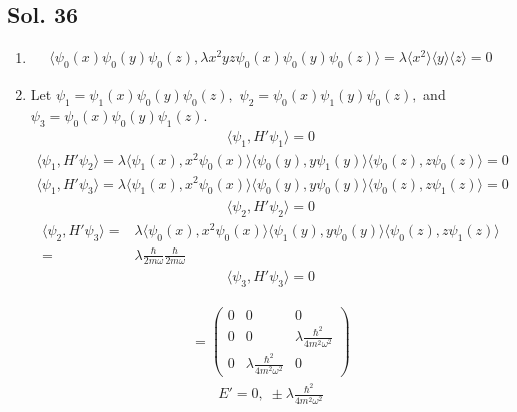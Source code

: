 \subsection*{Sol. 36}
\begin{enumerate}
    \item \begin{align*}
    \langle\psi_0(x)\psi_0(y)\psi_0(z), \lambda x^2yz\psi_0(x)\psi_0(y)\psi_0(z)\rangle=
    \lambda\langle x^2\rangle\langle y\rangle\langle z\rangle
    =0
\end{align*}
\item 
Let $\psi_1 = \psi_1(x)\psi_0(y)\psi_0(z),$ 
$\psi_2 = \psi_0(x)\psi_1(y)\psi_0(z),$ and 
$\psi_3 = \psi_0(x)\psi_0(y)\psi_1(z).$
\begin{align*}
    \langle \psi_1, H'\psi_1\rangle
    =0
\end{align*}
\begin{align*}
    \langle \psi_1, H'\psi_2\rangle
    =\lambda\langle\psi_1(x),x^2\psi_0(x)\rangle
    \langle\psi_0(y),y\psi_1(y)\rangle
    \langle\psi_0(z),z\psi_0(z)\rangle=0
\end{align*}
\begin{align*}
    \langle \psi_1, H'\psi_3\rangle
    =\lambda\langle\psi_1(x),x^2\psi_0(x)\rangle
    \langle\psi_0(y),y\psi_0(y)\rangle
    \langle\psi_0(z),z\psi_1(z)\rangle=0
\end{align*}
\begin{align*}
    \langle \psi_2, H'\psi_2\rangle
    =0
\end{align*}
\begin{align*}
    \langle \psi_2, H'\psi_3\rangle
    =&\lambda\langle\psi_0(x),x^2\psi_0(x)\rangle
    \langle\psi_1(y),y\psi_0(y)\rangle
    \langle\psi_0(z),z\psi_1(z)\rangle\\
    =&\lambda\frac{\hbar}{2m\omega}\frac{\hbar}{2m\omega}
\end{align*}
\begin{align*}
    \langle \psi_3, H'\psi_3\rangle
    =0
\end{align*}

\begin{align*}
    [H'] = 
    \begin{pmatrix}
        0 & 0 & 0 \\
        0 & 0 & \lambda\frac{\hbar^2}{4m^2\omega^2}\\
        0 & \lambda\frac{\hbar^2}{4m^2\omega^2} & 0
    \end{pmatrix}
\end{align*}
\begin{align*}
    E' = 0,\;\pm \lambda\frac{\hbar^2}{4m^2\omega^2}
\end{align*}


\end{enumerate}



